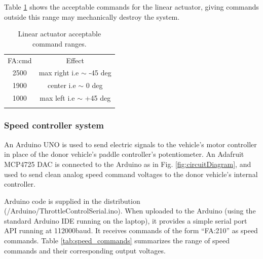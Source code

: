 \documentclass[a4paper]{article}
\begin{document}

Table \ref{tab:linear_actuator} shows the acceptable commands for the linear actuator, giving commands outside this range may mechanically destroy the system.  
\begin{table}
	\begin{center}
	\caption{Linear actuator acceptable command ranges.}
	\label{tab:linear_actuator}
		\begin{tabular}{ c c }
			\hline
			FA:cmd     &  Effect \\
			2500    &    max right i.e $\sim$ -45 deg \\
			1900    &    center i.e $\sim$ 0 deg \\ 
			1000    &    max left i.e $\sim$ +45 deg \\
			\hline\\
		\end{tabular}
	\end{center}   
\end{table}
 



\subsubsection{Speed controller system}

An Arduino UNO \cite{oxer2011practical} is used to send electric signals to the vehicle's motor controller in place of the donor vehicle’s paddle controller’s potentiometer. An Adafruit MCP4725 DAC is connected to the Arduino as in Fig. \ref{fig:circuitDiagram}, and used to send clean analog speed command voltages to the donor vehicle’s internal controller.

Arduino code is supplied in the distribution (/Arduino/ThrottleControlSerial.ino). When uploaded to the Arduino (using the standard Arduino IDE running on the laptop), it provides a simple serial port API running at 112000baud. It receives commands of the form “FA:210” as speed commands. Table \ref{tab:speed_commands} summarizes the range of speed commands and their corresponding output voltages. 
\end{document}
